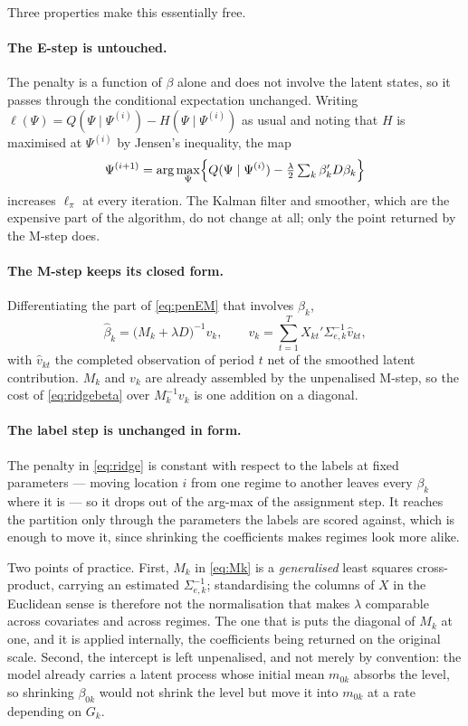 Three properties make this essentially free.

\paragraph{The E-step is untouched.} The penalty is a function of $\beta$ alone and does not involve the latent states, so it passes through the conditional expectation unchanged. Writing $\ell(\Psi) = Q(\Psi \mid \Psi^{(i)}) - H(\Psi \mid \Psi^{(i)})$ as usual and noting that $H$ is maximised at $\Psi^{(i)}$ by Jensen's inequality, the map
\begin{equation}
  \Psi^{(i+1)} = \arg\max_\Psi \Bigl\{ Q(\Psi \mid \Psi^{(i)}) - \tfrac{\lambda}{2}\textstyle\sum_k \beta_k' D \beta_k \Bigr\}
  \label{eq:penEM}
\end{equation}
increases $\ell_\pi$ at every iteration. The Kalman filter and smoother, which are the expensive part of the algorithm, do not change at all; only the point returned by the M-step does.

\paragraph{The M-step keeps its closed form.} Differentiating the part of \eqref{eq:penEM} that involves $\beta_k$,
\begin{equation}
  \hat\beta_k = \bigl( M_k + \lambda D \bigr)^{-1} v_k ,
  \qquad
  v_k = \sum_{t=1}^{T} X_{kt}' \Sigma_{e,k}^{-1} \hat v_{kt},
  \label{eq:ridgebeta}
\end{equation}
with $\hat v_{kt}$ the completed observation of period $t$ net of the smoothed latent contribution. $M_k$ and $v_k$ are already assembled by the unpenalised M-step, so the cost of \eqref{eq:ridgebeta} over $M_k^{-1}v_k$ is one addition on a diagonal.

\paragraph{The label step is unchanged in form.} The penalty in \eqref{eq:ridge} is constant with respect to the labels at fixed parameters --- moving location $i$ from one regime to another leaves every $\beta_k$ where it is --- so it drops out of the arg-max of the assignment step. It reaches the partition only through the parameters the labels are scored against, which is enough to move it, since shrinking the coefficients makes regimes look more alike.

Two points of practice. First, $M_k$ in \eqref{eq:Mk} is a \emph{generalised} least squares cross-product, carrying an estimated $\Sigma_{e,k}^{-1}$; standardising the columns of $X$ in the Euclidean sense is therefore not the normalisation that makes $\lambda$ comparable across covariates and across regimes. The one that is puts the diagonal of $M_k$ at one, and it is applied internally, the coefficients being returned on the original scale. Second, the intercept is left unpenalised, and not merely by convention: the model already carries a latent process whose initial mean $m_{0k}$ absorbs the level, so shrinking $\beta_{0k}$ would not shrink the level but move it into $m_{0k}$ at a rate depending on $G_k$.

